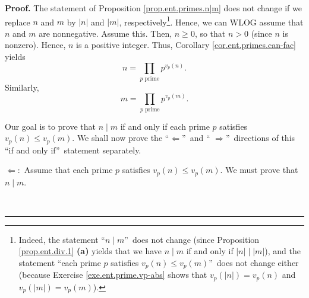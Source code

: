 \documentclass[numbers=enddot,12pt,final,onecolumn,notitlepage]{scrartcl}%
\numberwithin{exer}{subsection}
\theoremstyle{definition}
\newenvironment{proof}[1][Proof]{\noindent\textbf{#1.} }{\ \rule{0.5em}{0.5em}}
\let\prodnonlimits\prod
\renewcommand{\prod}{\prodnonlimits\limits}
\begin{document}
\begin{proof}
The statement of Proposition \ref{prop.ent.primes.n|m} does not change if we
replace $n$ and $m$ by $\left\vert n\right\vert $ and $\left\vert m\right\vert
$, respectively\footnote{Indeed, the statement \textquotedblleft$n\mid
m$\textquotedblright\ does not change (since Proposition \ref{prop.ent.div.1}
\textbf{(a)} yields that we have $n\mid m$ if and only if $\left\vert
n\right\vert \mid\left\vert m\right\vert $), and the statement
\textquotedblleft each prime $p$ satisfies $v_{p}\left(  n\right)  \leq
v_{p}\left(  m\right)  $\textquotedblright\ does not change either (because
Exercise \ref{exe.ent.prime.vp-abs} shows that $v_{p}\left(  \left\vert
n\right\vert \right)  =v_{p}\left(  n\right)  $ and $v_{p}\left(  \left\vert
m\right\vert \right)  =v_{p}\left(  m\right)  $).}. Hence, we can WLOG assume
that $n$ and $m$ are nonnegative. Assume this. Then, $n\geq0$, so that $n>0$
(since $n$ is nonzero). Hence, $n$ is a positive integer. Thus, Corollary
\ref{cor.ent.primes.can-fac} yields%
\begin{equation}
n=\prod_{p\text{ prime}}p^{v_{p}\left(  n\right)  }.
\label{pf.prop.ent.primes.n|m.n=}%
\end{equation}
Similarly,%
\begin{equation}
m=\prod_{p\text{ prime}}p^{v_{p}\left(  m\right)  }.
\label{pf.prop.ent.primes.n|m.m=}%
\end{equation}


Our goal is to prove that $n\mid m$ if and only if each prime $p$ satisfies
$v_{p}\left(  n\right)  \leq v_{p}\left(  m\right)  $. We shall now prove the
\textquotedblleft$\Longleftarrow$\textquotedblright\ and \textquotedblleft%
$\Longrightarrow$\textquotedblright\ directions of this \textquotedblleft if
and only if\textquotedblright\ statement separately.

$\Longleftarrow:$ Assume that each prime $p$ satisfies $v_{p}\left(  n\right)
\leq v_{p}\left(  m\right)  $. We must prove that $n\mid m$.


\end{proof}
\end{document}
